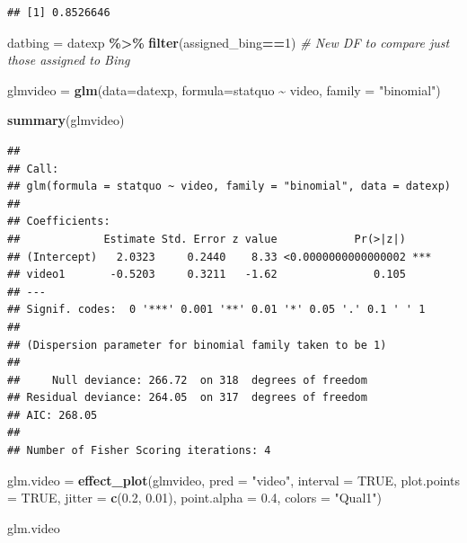 \documentclass[
  11pt,
]{article}
\newenvironment{Shaded}{\begin{snugshade}}{\end{snugshade}}
\newcommand{\AttributeTok}[1]{\textcolor[rgb]{0.13,0.29,0.53}{#1}}
\newcommand{\CommentTok}[1]{\textcolor[rgb]{0.56,0.35,0.01}{\textit{#1}}}
\newcommand{\ConstantTok}[1]{\textcolor[rgb]{0.56,0.35,0.01}{#1}}
\newcommand{\DecValTok}[1]{\textcolor[rgb]{0.00,0.00,0.81}{#1}}
\newcommand{\FloatTok}[1]{\textcolor[rgb]{0.00,0.00,0.81}{#1}}
\newcommand{\FunctionTok}[1]{\textcolor[rgb]{0.13,0.29,0.53}{\textbf{#1}}}
\newcommand{\NormalTok}[1]{#1}
\newcommand{\OtherTok}[1]{\textcolor[rgb]{0.56,0.35,0.01}{#1}}
\newcommand{\SpecialCharTok}[1]{\textcolor[rgb]{0.81,0.36,0.00}{\textbf{#1}}}
\newcommand{\StringTok}[1]{\textcolor[rgb]{0.31,0.60,0.02}{#1}}
\begin{document}
\begin{verbatim}
## [1] 0.8526646
\end{verbatim}

\begin{Shaded}
\begin{Highlighting}[]
\NormalTok{datbing }\OtherTok{=}\NormalTok{ datexp }\SpecialCharTok{\%\textgreater{}\%} 
  \FunctionTok{filter}\NormalTok{(assigned\_bing}\SpecialCharTok{==}\DecValTok{1}\NormalTok{) }\CommentTok{\# New DF to compare just those assigned to Bing}

\NormalTok{glmvideo }\OtherTok{=} \FunctionTok{glm}\NormalTok{(}\AttributeTok{data=}\NormalTok{datexp, }\AttributeTok{formula=}\NormalTok{statquo }\SpecialCharTok{\textasciitilde{}}\NormalTok{ video, }\AttributeTok{family =} \StringTok{"binomial"}\NormalTok{)}

\FunctionTok{summary}\NormalTok{(glmvideo)}
\end{Highlighting}
\end{Shaded}

\begin{verbatim}
## 
## Call:
## glm(formula = statquo ~ video, family = "binomial", data = datexp)
## 
## Coefficients:
##             Estimate Std. Error z value            Pr(>|z|)    
## (Intercept)   2.0323     0.2440    8.33 <0.0000000000000002 ***
## video1       -0.5203     0.3211   -1.62               0.105    
## ---
## Signif. codes:  0 '***' 0.001 '**' 0.01 '*' 0.05 '.' 0.1 ' ' 1
## 
## (Dispersion parameter for binomial family taken to be 1)
## 
##     Null deviance: 266.72  on 318  degrees of freedom
## Residual deviance: 264.05  on 317  degrees of freedom
## AIC: 268.05
## 
## Number of Fisher Scoring iterations: 4
\end{verbatim}

\begin{Shaded}
\begin{Highlighting}[]
\NormalTok{glm.video }\OtherTok{=} \FunctionTok{effect\_plot}\NormalTok{(glmvideo, }\AttributeTok{pred =} \StringTok{"video"}\NormalTok{, }\AttributeTok{interval =} \ConstantTok{TRUE}\NormalTok{, }\AttributeTok{plot.points =} \ConstantTok{TRUE}\NormalTok{, }\AttributeTok{jitter =} \FunctionTok{c}\NormalTok{(}\FloatTok{0.2}\NormalTok{, }\FloatTok{0.01}\NormalTok{), }\AttributeTok{point.alpha =} \FloatTok{0.4}\NormalTok{, }\AttributeTok{colors =} \StringTok{"Qual1"}\NormalTok{)}

\NormalTok{glm.video}
\end{Highlighting}
\end{Shaded}
\end{document}
